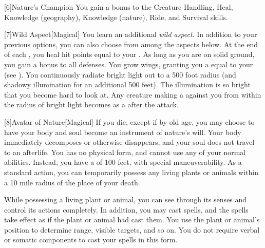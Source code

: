         [6]{Nature's Champion}
        You gain a  bonus to the Creature Handling, Heal, Knowledge (geography), Knowledge (nature), Ride, and Survival skills.

        [7]{Wild Aspect}[Magical]
        You learn an additional \textit{wild aspect}.
        In addition to your previous options, you can also choose from among the aspects below.
        {
            At the end of each , you heal hit points equal to your .
             As long as you are on solid ground, you gain a  bonus to all defenses.
            You grow wings, granting you a  equal to your  (see ).
            You continuously radiate bright light out to a 500 foot radius (and shadowy illumination for an additional 500 feet).
            The illumination is so bright that you become hard to look at.
            Any creature making a  against you from within the radius of bright light becomes \dazzled as a  after the attack.
        }

        [8]{Avatar of Nature}[Magical]
        If you die, except if by old age, you may choose to have your body and soul become an instrument of nature's will.
        Your body immediately decomposes or otherwise disappears, and your soul does not travel to an afterlife.
        You has no physical form, and cannot use any of your normal abilities.
        Instead, you have a  of 100 feet, with special maneuverability.
        As a standard action, you can temporarily possess any living plants or animals within a 10 mile radius of the place of your death.

        While possessing a living plant or animal, you can see through its senses and control its actions completely.
        In addition, you may cast spells, and the spells take effect as if the plant or animal had cast them.
        You use the plant or animal's position to determine range, visible targets, and so on.
        You do not require verbal or somatic components to cast your spells in this form.


